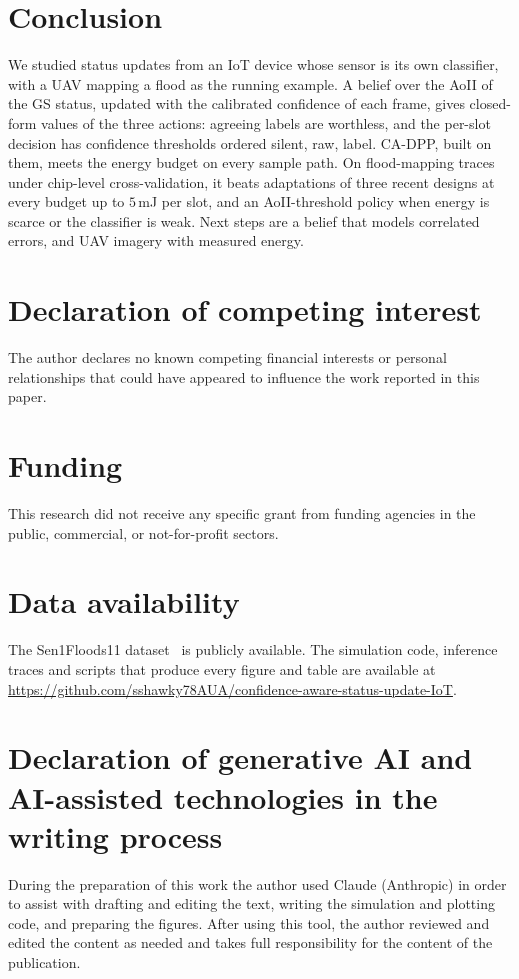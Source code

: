 \documentclass[5p,twocolumn]{elsarticle}
\theoremstyle{remark}
\begin{document}
\section{Conclusion}\label{sec:concl}
We studied status updates from an IoT device whose sensor is its own classifier, with a UAV mapping a flood as the running example. A belief over the AoII of the GS status, updated with the calibrated confidence of each frame, gives closed-form values of the three actions: agreeing labels are worthless, and the per-slot decision has confidence thresholds ordered silent, raw, label. CA-DPP, built on them, meets the energy budget on every sample path. On flood-mapping traces under chip-level cross-validation, it beats adaptations of three recent designs at every budget up to $5$\,mJ per slot, and an AoII-threshold policy when energy is scarce or the classifier is weak. Next steps are a belief that models correlated errors, and UAV imagery with measured energy.

\section*{Declaration of competing interest}
The author declares no known competing financial interests or personal relationships that could have appeared to influence the work reported in this paper.

\section*{Funding}
This research did not receive any specific grant from funding agencies in the public, commercial, or not-for-profit sectors.

\section*{Data availability}
The Sen1Floods11 dataset~\cite{bonafilia2020sen1floods11} is publicly available. The simulation code, inference traces and scripts that produce every figure and table are available at \url{https://github.com/sshawky78AUA/confidence-aware-status-update-IoT}.

\section*{Declaration of generative AI and AI-assisted technologies in the writing process}
During the preparation of this work the author used Claude (Anthropic) in order to assist with drafting and editing the text, writing the simulation and plotting code, and preparing the figures. After using this tool, the author reviewed and edited the content as needed and takes full responsibility for the content of the publication.
\end{document}
